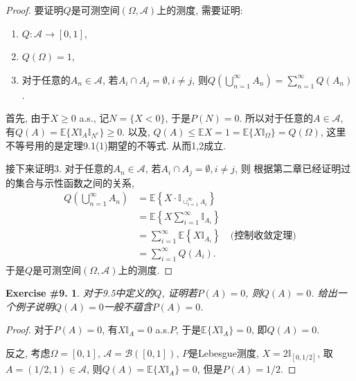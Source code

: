 \documentclass[UTF8, a4paper]{article}
\newtheorem{exercise}{Exercise \#9.}
\begin{document}
\begin{proof}
要证明\(Q\)是可测空间\((\Omega, \mathcal{A})\)上的测度, 需要证明:
\begin{enumerate}
    \item \(Q: \mathcal{A} \to [0,1]\),
    \item \(Q(\Omega) = 1\),
    \item 对于任意的\(A_n \in \mathcal{A}\), 若\(A_i \cap A_j = \emptyset, i \neq j\), 则\(Q\left(\bigcup_{n=1}^\infty A_n\right) = \sum_{n=1}^\infty Q(A_n)\).
\end{enumerate}

首先, 由于\(X \geq 0\) a.s., 记\(N = \{X < 0\}\), 于是\(P(N) = 0\).
所以对于任意的\(A \in \mathcal{A}\), 有\(Q(A) = \mathbb{E}\{X \mathbb{I}_A \mathbb{I}_{N^c}\} \geq 0\).
以及, \(Q(A) \leq \mathbb{E}X = 1 =  \mathbb{E}\{X \mathbb{I}_\Omega\} = Q(\Omega)\), 这里不等号用的是定理9.1(1)期望的不等式.
从而1,2成立.

接下来证明3.
对于任意的\(A_n \in \mathcal{A}\), 若\(A_i \cap A_j = \emptyset, i \neq j\), 则
根据第二章已经证明过的集合与示性函数之间的关系, 
$$
\begin{aligned}
    Q\left(\bigcup_{n=1}^\infty A_n\right) &= \mathbb{E}\left\{ X \cdot \mathbb{I}_{\cup_{i=1}^\infty A_i} \right\} \\
    &= \mathbb{E}\left\{ X \sum_{i=1}^\infty \mathbb{I}_{A_i} \right\} \\
    &= \sum_{i=1}^\infty \mathbb{E}\left\{ X \mathbb{I}_{A_i} \right\} \quad \text{(控制收敛定理)}\\
    &= \sum_{i=1}^\infty Q(A_i).
\end{aligned}
$$
于是\(Q\)是可测空间\((\Omega, \mathcal{A})\)上的测度.
\end{proof}




\begin{framed}
\begin{exercise}
对于9.5中定义的\(Q\), 证明若\(P(A) = 0\), 则\(Q(A) = 0\).
给出一个例子说明\(Q(A) = 0\)一般不蕴含\(P(A) = 0\).
\end{exercise}
\end{framed}

\begin{proof}
对于\(P(A) = 0\), 有\(X \mathbb{I}_A = 0\) a.s.\(P\), 于是\(\mathbb{E}\{X \mathbb{I}_A\} = 0\), 即\(Q(A) = 0\).

反之, 考虑\(\Omega = [0,1]\), \(\mathcal{A} = \mathcal{B}([0,1])\), \(P\)是Lebesgue测度, \(X = 2\mathbb{I}_{[0,1/2]}\), 
取\(A = (1/2, 1) \in \mathcal{A} \), 
则\(Q(A) = \mathbb{E}\{X \mathbb{I}_A\} = 0\), 但是\(P(A) = 1/2\).
\end{proof}
\end{document}
